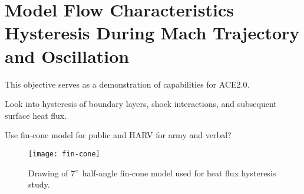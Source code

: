\section{Model Flow Characteristics Hysteresis During Mach Trajectory and Oscillation}

This objective serves as a demonstration of capabilities for ACE2.0. 

Look into hysteresis of boundary layers, shock interactions, and subsequent surface heat flux. 

Use fin-cone model for public and HARV for army and verbal?

\begin{figure}[ht]
    \centering
    \texttt{[image: fin-cone]}
    \caption{Drawing of 7$\degree$ half-angle fin-cone model used for heat flux hysteresis study.}
    \label{fig:fin-cone}
\end{figure}

